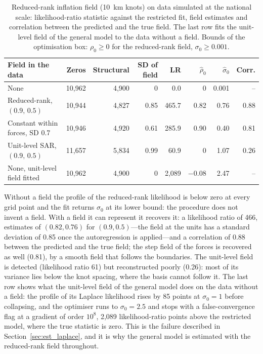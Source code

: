 \begin{table}[htbp]
\centering
\caption{Reduced-rank inflation field (10~km knots) on data simulated at the national scale: likelihood-ratio statistic against the restricted fit, field estimates and correlation between the predicted and the true field. The last row fits the unit-level field of the general model to the data without a field. Bounds of the optimisation box: $\rho_0 \ge 0$ for the reduced-rank field, $\sigma_0 \ge 0.001$.}\label{tab:general_sim}
\footnotesize
\begin{tabular}{lrrrrrrr}
\toprule
Field in the data & Zeros & Structural & SD of field & LR & $\hat\rho_0$ & $\hat\sigma_0$ & Corr. \\
\midrule
None                               & 10{,}962 & 4{,}900 & 0    & 0.0   & 0     & 0.001 & -- \\
Reduced-rank, $(0.9,\,0.5)$        & 10{,}944 & 4{,}827 & 0.85 & 465.7 & 0.82  & 0.76  & 0.88 \\
Constant within forces, SD 0.7     & 10{,}946 & 4{,}920 & 0.61 & 285.9 & 0.90  & 0.40  & 0.81 \\
Unit-level SAR, $(0.9,\,0.5)$      & 11{,}657 & 5{,}834 & 0.99 & 60.9  & 0     & 1.07  & 0.26 \\
\midrule
None, unit-level field fitted      & 10{,}962 & 4{,}900 & 0    & 2{,}089 & $-0.08$ & 2.47 & -- \\
\bottomrule
\end{tabular}
\end{table}

Without a field the profile of the reduced-rank likelihood is below zero at every grid point and the fit returns $\sigma_0$ at its lower bound: the procedure does not invent a field.
With a field it can represent it recovers it: a likelihood ratio of 466, estimates of $(0.82, 0.76)$ for $(0.9, 0.5)$---the field at the units has a standard deviation of 0.85 once the autoregression is applied---and a correlation of 0.88 between the predicted and the true field; the step field of the forces is recovered as well (0.81), by a smooth field that follows the boundaries.
The unit-level field is detected (likelihood ratio 61) but reconstructed poorly (0.26): most of its variance lies below the knot spacing, where the basis cannot follow it.
The last row shows what the unit-level field of the general model does on the data without a field: the profile of its Laplace likelihood rises by 85 points at $\sigma_0 = 1$ before collapsing, and the optimiser runs to $\sigma_0 = 2.5$ and stops with a false-convergence flag at a gradient of order $10^8$, 2{,}089 likelihood-ratio points above the restricted model, where the true statistic is zero.
This is the failure described in Section~\ref{sec:est_laplace}, and it is why the general model is estimated with the reduced-rank field throughout.

